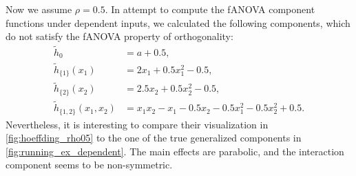 Now we assume $\rho = 0.5$. In attempt to compute the fANOVA component functions under dependent inputs, we calculated the following components, which do not satisfy the fANOVA property of orthogonality:
\begin{align*}
\tilde{h}_0 &= a + 0.5, \\[0.5em]
\tilde{h}_{\{1\}}(x_1) &= 2x_1 + 0.5x_1^2 - 0.5, \\[0.5em]
\tilde{h}_{\{2\}}(x_2) &= 2.5x_2 + 0.5x_2^2 - 0.5, \\[0.5em]
\tilde{h}_{\{1,2\}}(x_1,x_2) &= x_1x_2 - x_1 - 0.5x_2 - 0.5x_1^2 - 0.5x_2^2 + 0.5.
\end{align*}
Nevertheless, it is interesting to compare their visualization in \autoref{fig:hoeffding_rho05} to the one of the true generalized components in \autoref{fig:running_ex_dependent}.
The main effects are parabolic, and the interaction component seems to be non-symmetric.

